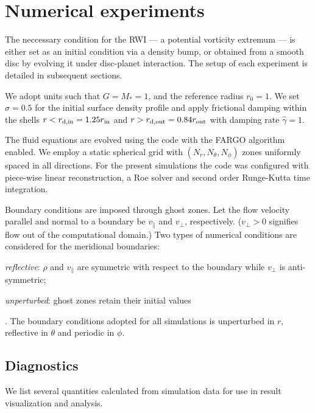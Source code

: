 \section{Numerical experiments}
The neccessary condition for the RWI --- a potential vorticity 
extremum --- is either set as an initial condition via a density bump, 
or obtained from a smooth disc by evolving it under disc-planet
interaction. The setup of each experiment is detailed in subsequent
sections.    

We adopt units such that $G=M_*=1$, and the reference radius $r_0=1$.    
We set $\sigma=0.5$ for the initial surface density profile and apply 
frictional damping within the shells $r<r_\mathrm{d,in} = 1.25r_\mathrm{in}$
and $r>r_\mathrm{d,out}=0.84r_\mathrm{out}$ with damping rate $\hat{\gamma}=1$. 

The fluid equations are evolved using the \pluto code \citep{mignone07} with 
the FARGO algorithm enabled\citep{mignone12}. We employ a static
spherical grid with $(N_r, N_\theta, N_\phi)$ zones uniformly spaced
in all directions. For the present simulations the code was configured
with piece-wise linear reconstruction, a Roe solver and second order
Runge-Kutta time integration.   

Boundary conditions are imposed through ghost zones.   
Let the flow velocity parallel and normal to a boundary be
$v_\parallel$ and $v_\perp$, respectively. ($v_\perp>0$ signifies flow
out of the computational domain.) Two types of numerical 
conditions are considered for the meridional boundaries:
\begin{inparaenum}[(a)]
\item \emph{reflective}: $\rho$ and $v_\parallel$ are symmetric with
  respect to the boundary while $v_\perp$ is anti-symmetric;  
\item \emph{unperturbed}: ghost zones retain their initial values
\end{inparaenum}.
The boundary conditions adopted for all simulations is unperturbed in
$r$, reflective in $\theta$ and periodic in $\phi$. 


\subsection{Diagnostics}
We list several quantities calculated from simulation data for use in
result visualization and analysis.  

